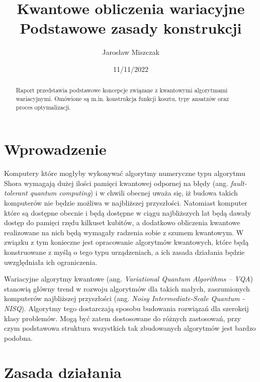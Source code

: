 \documentclass[a4paper,11pt]{article}
\newcommand{\ang}[1]{(ang. \emph{#1})}
\begin{document}
\title{Kwantowe obliczenia wariacyjne\\ {\normalsize Podstawowe zasady konstrukcji}}

\author{Jarosław Miszczak}
\date{11/11/2022}

\maketitle

\begin{abstract}
Raport przedstawia podstawowe koncepcje związane z kwantowymi algorytmami wariacyjnymi. Omówione są m.in. konstrukcja funkcji kosztu, typy ansatzów oraz proces optymalizacji.
\end{abstract}


\hypertarget{wprowadzenie}{%
\section{Wprowadzenie}\label{wprowadzenie}}

 Komputery które mogłyby wykonywać algorytmy numeryczne typu algorytmu Shora wymagają dużej ilości pamięci kwantowej odpornej na błędy \ang{fault-tolerant quantum computing} i w chwili obecnej uważa się, iż budowa takich komputerów nie będzie możliwa w najbliższej przyszłości. Natomiast komputer które są dostępne obecnie i będą dostępne w ciągu najbliższych lat będą dawały dostęp do pamięci rzędu kilkuset kubitów, a dodatkowo obliczenia kwantowe realizowane na nich będą wymagały radzenia sobie z szumem kwantowym. W związku z tym konieczne jest opracowanie algorytmów kwantowych, które będą konstruowane z myślą o tego typu urządzeniach, a ich zasada działania będzie uwzględniała ich ograniczenia.
 
 Wariacyjne algorytmy kwantowe \ang{Variational Quantum Algorithms -- VQA} stanowią główny trend w rozwoju algorytmów dla takich małych, zaszumionych komputerów najbliższej przyszłości \ang{Noisy Intermediate-Scale Quantum - NISQ}. Algorytmy tego dostarczają sposobu budowania rozwiązań dla szerokeij klasy problemów. Mogą być zatem dostosowane do różnych zastosowań, przy czym podstawowa struktura wszystkich tak zbudowanych algorytmów jest bardzo podobna.

\newpage 

\hypertarget{zasada-dzialania}{%
	\section{Zasada działania}\label{zasada-dzialania}}
\end{document}
